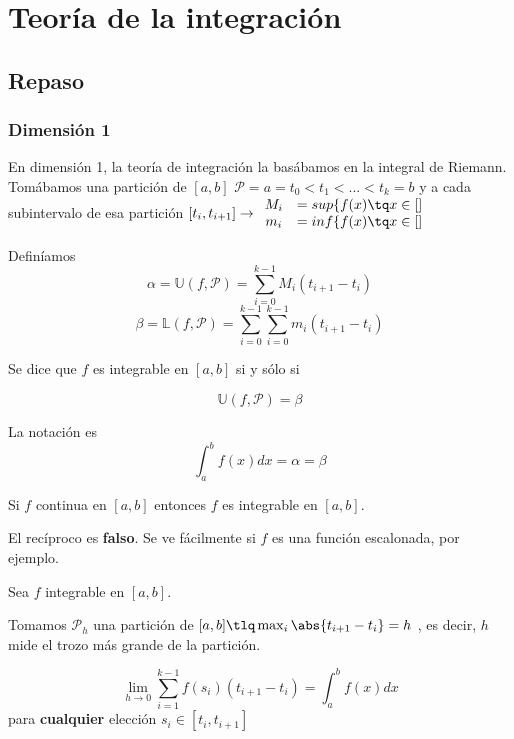 \section{Teoría de la integración}

\subsection{Repaso}

\subsubsection{Dimensión 1}

En dimensión 1, la teoría de integración la basábamos en la integral de Riemann. Tomábamos una partición de $[a,b]$ $\mathcal{P} = a = t_0 < t_1<...<t_k = b$ y a cada subintervalo de esa partición $[t_i,t_{i+1}] \rightarrow \begin{array}{cc} 
M_i &= sup\{f(x)\tq x\in []\\
m_i &= inf \{f(x)\tq x\in []\end{array}$ 

Definíamos \[ \alpha = \mathbb{U}(f,\mathcal{P}) = \sum_{i=0}^{k-1} M_i(t_{i+1}-t_i)\]
\[ \beta = \mathbb{L}(f,\mathcal{P}) = \sum_{i=0}^{k-1} \sum_{i=0}^{k-1} m_i(t_{i+1}-t_i)\]

\begin{defn} Se dice que $f$ es integrable en $[a,b]$ si y sólo si 

\[ \mathbb{U}(f,\mathcal{P}) = \beta \] 

La notación es \[ \int_a^b f(x)dx = \alpha = \beta \]
\end{defn}

\begin{theorem}
Si $f$ continua en $[a,b]$ entonces  $f$ es integrable en $[a,b]$.
\end{theorem}

El recíproco es \textbf{falso}. Se ve fácilmente si $f$ es una función escalonada, por ejemplo.

\begin{theorem} Sea $f$ integrable en $[a,b]$.

Tomamos $\mathcal{P}_h$ una partición de $[a,b] \tlq \max_{i} \abs{t_{i+1}-t_i} = h$ , es decir, $h$ mide el trozo más grande de la partición.

\[ \lim_{h\rightarrow 0} \sum_{i=1}^{k-1} f(s_i)(t_{i+1}-t_i) = \int_a^bf(x)dx \] para \textbf{cualquier} elección $s_i\in[t_i,t_{i+1}]$	

\end{theorem} 

